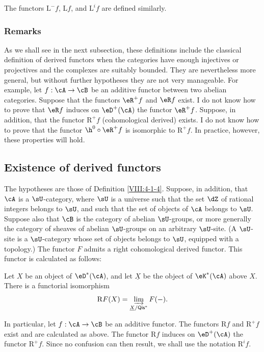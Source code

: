 The functors $\mathrm{L}^- f$, $\mathrm{L} f$, and $\mathrm{L}^i f$ are defined similarly.

\subsubsection{Remarks}\label{VIII:4-1-6}

As we shall see in the next subsection, these definitions include the
classical definition of derived functors when the categories have enough
injectives or projectives and the complexes are suitably bounded. They are
nevertheless more general, but without further hypotheses they are not
very manageable. For example, let $f:\cA\to \cB$ be an additive functor
between two abelian categories. Suppose that the functors $\eR^+ f$ and
$\eR f$ exist. I do not know how to prove that $\eR f$ induces on
$\eD^+(\cA)$ the functor $\eR^+ f$. Suppose, in addition, that the functor
$\mathrm{R}^+ f$ (cohomological derived) exists. I do not know how to prove that
the functor $\h^0{}\circ \eR^+ f$ is isomorphic to $\mathrm{R}^+ f$. In practice,
however, these properties will hold.

\subsection{Existence of derived functors}\label{VIII:4-2}

\begin{proposition}\label{VIII:4-2-1}
The hypotheses are those of Definition \ref{VIII:4-1-4}. Suppose, in
addition, that $\cA$ is a $\sU$-category, where $\sU$ is a universe such
that the set $\dZ$ of rational integers belongs to $\sU$, and such that
the set of objects of $\cA$ belongs to $\sU$. Suppose also that $\cB$ is
the category of abelian $\sU$-groups, or more generally the category of
sheaves of abelian $\sU$-groups on an arbitrary $\sU$-site. (A $\sU$-site
is a $\sU$-category whose set of objects belongs to $\sU$, equipped with
a topology.) The functor $F$ admits a right cohomological derived functor.
This functor is calculated as follows:

Let $X$ be an object of $\eD^\ast(\cA)$, and let $\underline X$ be the
object of $\eK^\ast(\cA)$ above $X$. There is a functorial isomorphism
\[
  \mathrm{R} F(X) = \varinjlim_{\underline X/\mathsf{Qis}^\ast} F(-) \text{.}
\]
\end{proposition}

In particular, let $f:\cA\to \cB$ be an additive functor. The functors
$\mathrm{R} f$ and $\mathrm{R}^+ f$ exist and are calculated as above. The functor
$\mathrm{R} f$ induces on $\eD^+(\cA)$ the functor $\mathrm{R}^+ f$. Since no confusion
can then result, we shall use the notation $\mathrm{R}^i f$.

